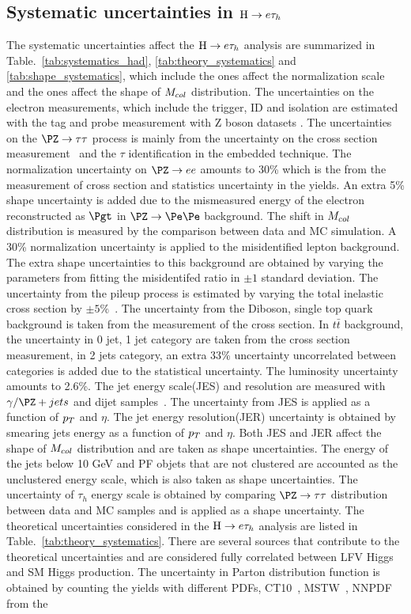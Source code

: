 \subsection{Systematic uncertainties in $\mathrm{H} \to e \tau_{h}$}

The systematic uncertainties affect the $\mathrm{H} \to e \tau_{h}$ analysis are summarized in Table.~\ref{tab:systematics_had}, \ref{tab:theory_systematics} and \ref{tab:shape_systematics}, which include the ones affect the normalization scale and the ones affect the shape of $M_{col}$ distribution. The uncertainties on the electron measurements, which include the trigger, ID and isolation are estimated with the tag and probe measurement with Z boson datasets \cite{CMS:2011aa,Khachatryan:2015dfa}. The uncertainties on the $\PZ \to \tau \tau$ process is mainly from the uncertainty on the cross section measurement~\cite{Chatrchyan:2014mua} and the $\tau$ identification in the embedded technique. The normalization uncertainty on $\PZ \to ee$ amounts to 30\% which is the from the measurement of cross section and statistics uncertainty in the yields. An extra 5\% shape uncertainty is added due to the mismeasured energy of the electron reconstructed as $\Pgt$ in $\PZ \to \Pe\Pe$ background.  The shift in $M_{col}$ distribution is measured by the comparison between data and MC simulation. A 30\% normalization uncertainty is applied to the misidentified lepton background. The extra shape uncertainties to this background are obtained by varying the parameters from fitting the misidentifed ratio in $\pm1$ standard deviation.   The uncertainty from the pileup process is estimated by varying the total inelastic cross section by $\pm5\%$~\cite{Chatrchyan:2012nj}. The uncertainty from the Diboson, single top quark background is taken from the measurement of the cross section. In $t\bar{t}$ background, the uncertainty in 0 jet, 1 jet category are taken from the cross section measurement, in 2  jets category, an extra 33\% uncertainty uncorrelated between categories is added due to the statistical uncertainty. The luminosity uncertainty amounts to 2.6\%.  The jet energy scale(JES) and resolution are measured with $\gamma/\PZ+jets$ and dijet samples~\cite{CMS-JME-10-011}. The uncertainty from JES is applied as a function of $p_{T}$ and $\eta$. The jet energy resolution(JER) uncertainty is obtained by smearing jets energy as a function of $p_{T}$ and $\eta$. Both JES and JER affect the shape of $M_{col}$ distribution and are taken as shape uncertainties. The energy of the jets below 10 GeV and PF objets that are not clustered are accounted as the unclustered energy scale, which is also taken as shape uncertainties. The uncertainty of $\tau_{h}$ energy scale is obtained by comparing $\PZ \to \tau\tau$ distribution between data and MC samples and is applied as a shape uncertainty. The theoretical uncertainties considered in the $\mathrm{H} \to e \tau_{h}$ analysis are listed in Table.~\ref{tab:theory_systematics}. There are several sources that contribute to the theoretical uncertainties and are considered fully correlated between LFV Higgs and SM Higgs production. The uncertainty in Parton distribution function is obtained by counting the yields with different PDFs,  CT10~\cite{Nadolsky:2008zw}, MSTW~\cite{Martin:2009iq}, NNPDF~\cite{Ball:2010de}  from the 